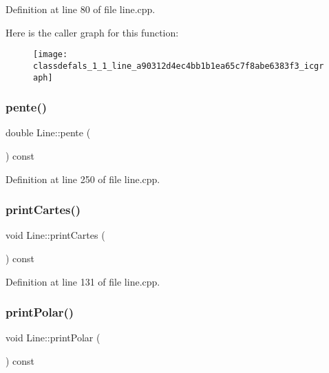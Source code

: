 Definition at line 80 of file line.\+cpp.

Here is the caller graph for this function\+:\nopagebreak
\begin{figure}[H]
\begin{center}
\leavevmode
\texttt{[image: classdefals\_1\_1\_line\_a90312d4ec4bb1b1ea65c7f8abe6383f3\_icgraph]}
\end{center}
\end{figure}
\mbox{\label{classdefals_1_1_line_ab8aafcf0f1dc98dcd8193a92c169500b}} 
\subsubsection{\texorpdfstring{pente()}{pente()}}
{\footnotesize\ttfamily double Line\+::pente (\begin{DoxyParamCaption}{ }\end{DoxyParamCaption}) const}



Definition at line 250 of file line.\+cpp.

\mbox{\label{classdefals_1_1_line_a56673f0353400060779c6f3b994f110e}} 
\subsubsection{\texorpdfstring{print\+Cartes()}{printCartes()}}
{\footnotesize\ttfamily void Line\+::print\+Cartes (\begin{DoxyParamCaption}{ }\end{DoxyParamCaption}) const}



Definition at line 131 of file line.\+cpp.

\mbox{\label{classdefals_1_1_line_af77fba109ba0f85eca871478f2a9fe28}} 
\subsubsection{\texorpdfstring{print\+Polar()}{printPolar()}}
{\footnotesize\ttfamily void Line\+::print\+Polar (\begin{DoxyParamCaption}{ }\end{DoxyParamCaption}) const}



